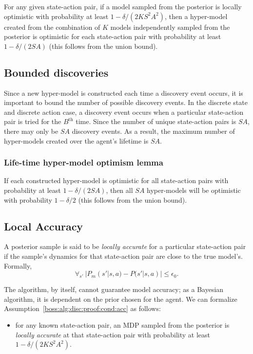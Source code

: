 
For any given state-action pair, if a model sampled from the posterior is locally optimistic with probability at least $1-\delta/(2 K S^2 A^2)$, then a hyper-model created from the combination of $K$ models independently sampled from the posterior is optimistic for each state-action pair with probability at least $1-\delta/(2 S A)$ (this follows from the union bound). 

\subsection{Bounded discoveries}

Since a new hyper-model is constructed each time a discovery event occurs, it is important to bound the number of possible discovery events. In the discrete state and discrete action case, a discovery event occurs when a particular state-action pair is tried for the $B^{\mbox{th}}$ time. Since the number of unique state-action pairs is $S A$, there may only be $S A$ discovery events. As a result, the maximum number of hyper-models created over the agent's lifetime is $S A$.

\subsubsection{Life-time hyper-model optimism lemma}

If each constructed hyper-model is optimistic for all state-action pairs with probability at least $1-\delta/(2 S A)$, then all $S A$ hyper-models will be optimistic with probability $1-\delta/2$ (this follows from the union bound).

\subsection{Local Accuracy}

A posterior sample is said to be \emph{locally accurate} for a particular state-action pair if the sample's dynamics for that state-action pair are close to the true model's. Formally,
$$\forall_{s'} ~ |P_m(s'|s,a)-P(s'|s,a)| \leq \epsilon_0.$$

The  algorithm, by itself, cannot guarantee model accuracy; as a Bayesian algorithm, it is dependent on the prior chosen for the agent. We can formalize Assumption~\ref{boss:alg:disc:proof:cond:acc} as follows:
\begin{itemize}
\item for any known state-action pair, an MDP sampled from the posterior is \emph{locally accurate} at that state-action pair with probability at least $1-\delta/(2 K S^2 A^2)$.
\end{itemize}


